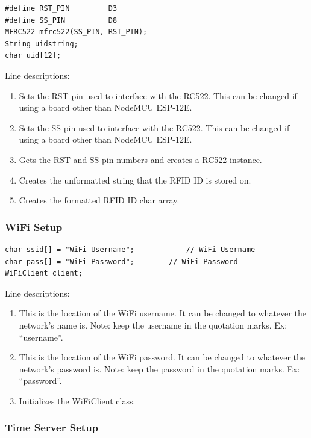 \documentclass[12pt]{article}
\begin{document}
\begin{spacing}{1.2}
\begin{lstlisting}[language=Arduino]  
#define RST_PIN         D3          
#define SS_PIN          D8          
MFRC522 mfrc522(SS_PIN, RST_PIN);  
String uidstring;
char uid[12];
\end{lstlisting}

Line descriptions:
\begin{enumerate}
	\item Sets the RST pin used to interface with the RC522. This can be changed if using a board other than NodeMCU ESP-12E.
	\item Sets the SS pin used to interface with the RC522. This can be changed if using a board other than NodeMCU ESP-12E.
	\item Gets the RST and SS pin numbers and creates a RC522 instance.
	\item Creates the unformatted string that the RFID ID is stored on.
	\item Creates the formatted RFID ID char array.
\end{enumerate}

\subsubsection{WiFi Setup}

\begin{lstlisting}[language=Arduino]  
char ssid[] = "WiFi Username";       	  // WiFi Username
char pass[] = "WiFi Password";    	  // WiFi Password
WiFiClient client;                
\end{lstlisting}

Line descriptions:
\begin{enumerate}
	\item This is the location of the WiFi username. It can be changed to whatever the network's name is. Note: keep the username in the quotation marks. Ex: ``username''.
	\item This is the location of the WiFi password. It can be changed to whatever the network's password is. Note: keep the password in the quotation marks. Ex: ``password''.
	\item Initializes the WiFiClient class.
\end{enumerate}

\subsubsection{Time Server Setup}


\end{spacing}
\end{document}
